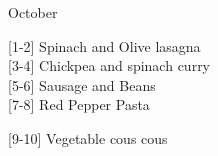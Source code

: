 		\begin{menu}{October}
    
    \begin{recipelist}
    
        {\scriptsize[1-2]} Spinach and Olive lasagna\\
        {\scriptsize[3-4]} Chickpea and spinach curry\\
        {\scriptsize[5-6]} Sausage and Beans\\
        {\scriptsize[7-8]} Red Pepper Pasta\\%
    \end{recipelist}%
    \begin{recipelist}
    
        {\scriptsize[9-10]} Vegetable cous cous\\
    \end{recipelist}\par%
  

\end{menu}
